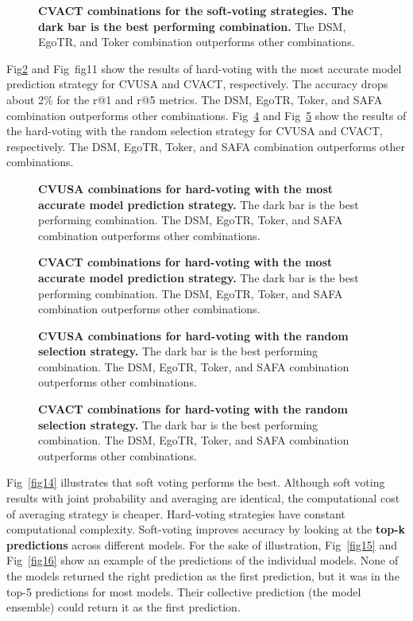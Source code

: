 \documentclass[10pt,letterpaper]{article}
\begin{document}
\begin{figure}[!h]
  \caption{{\bf CVACT combinations for the soft-voting strategies. The dark bar is the best performing combination.} The DSM, EgoTR, and Toker combination outperforms other combinations. }
  
  \label{fig9}
\end{figure}

Fig\ref{fig10} and Fig~{fig11} show the results of hard-voting with the most accurate model prediction strategy for CVUSA and CVACT, respectively. The accuracy drops about 2\% for the r@1 and r@5 metrics. The DSM, EgoTR, Toker, and SAFA combination outperforms other combinations. Fig~\ref{fig12} and Fig~\ref{fig13} show the results of the hard-voting with the random selection strategy for CVUSA and CVACT, respectively. The DSM, EgoTR, Toker, and SAFA combination outperforms other combinations.


\begin{figure}[!h]
  \caption{{\bf CVUSA combinations for hard-voting with the most accurate model prediction strategy.} The dark bar is the best performing combination. The DSM, EgoTR, Toker, and SAFA combination outperforms other combinations.}
  \label{fig10}
\end{figure}

\begin{figure}[!h]
  \caption{{\bf CVACT combinations for hard-voting with the most accurate  model prediction strategy.} The dark bar is the best performing combination. The DSM, EgoTR, Toker, and SAFA combination outperforms other combinations.}
  
  \label{fig11}
\end{figure}

\begin{figure}[!h]
  \caption{{\bf CVUSA combinations for hard-voting with the random selection strategy.} The dark bar is the best performing combination. The DSM, EgoTR, Toker, and SAFA combination outperforms other combinations. }
  \label{fig12}
\end{figure}

\begin{figure}[!h]
  \caption{{\bf CVACT combinations for hard-voting with the random selection strategy.}   The dark bar is the best performing combination. The DSM, EgoTR, Toker, and SAFA combination outperforms other combinations.}
  \label{fig13}
\end{figure}


Fig~\ref{fig14} illustrates that soft voting performs  the best. Although soft voting results with joint probability and averaging are identical, the computational cost of averaging strategy is cheaper. Hard-voting strategies have constant computational complexity. Soft-voting improves accuracy by looking at the {\bf top-k predictions} across different models. For the sake of illustration,  Fig~\ref{fig15} and Fig~\ref{fig16} show an example of the predictions of the individual models. None of the models returned the right prediction as the first prediction, but it was in the top-5 predictions for most models. Their collective prediction (the model ensemble) could return it as the first prediction.
\end{document}
